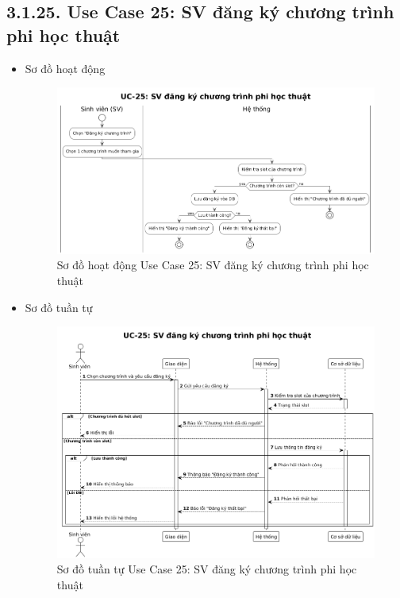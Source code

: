 \subsection*{3.1.25. Use Case 25: SV đăng ký chương trình phi học thuật}
\begin{itemize}
    \item Sơ đồ hoạt động
    \begin{figure}[H]
    \centering
    \includegraphics[scale=0.4 ]{Picture/ACUC25.png}
    \caption{Sơ đồ hoạt động Use Case 25: SV đăng ký chương trình phi học thuật}
    \end{figure}
    \item Sơ đồ tuần tự
    \begin{figure}[H]
    \centering
    \includegraphics[scale=0.4 ]{Picture/SEUC25.png}
    \caption{Sơ đồ tuần tự Use Case 25: SV đăng ký chương trình phi học thuật}
    \end{figure}
\end{itemize}
\newpage
